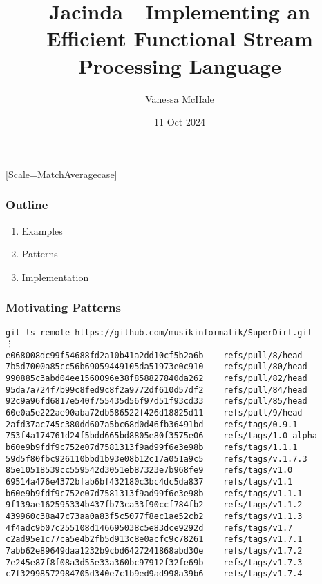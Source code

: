 \documentclass{beamer}
\begin{document}
\setmonofont{Jet Brains Mono}[Scale=MatchAveragecase]

\title{Jacinda---Implementing an Efficient Functional Stream Processing Language}
\author{Vanessa McHale}
\date{11 Oct 2024}

\begin{frame}
\titlepage
\end{frame}

\begin{frame}
  \frametitle{Outline}
  \begin{enumerate}
    \item Examples
    \item Patterns
    \item Implementation
  \end{enumerate}
\end{frame}

\begin{frame}
  \frametitle{Motivating Patterns}
\end{frame}

\begin{frame}[fragile]
\begin{Verbatim}[fontsize=\tiny]
git ls-remote https://github.com/musikinformatik/SuperDirt.git
⋮
e068008dc99f54688fd2a10b41a2dd10cf5b2a6b	refs/pull/8/head
7b5d7000a85cc56b69059449105da51973e0c910	refs/pull/80/head
990885c3abd04ee1560096e38f858827840da262	refs/pull/82/head
95da7a724f7b99c8fed9c8f2a9772df610d57df2	refs/pull/84/head
92c9a96fd6817e540f755435d56f97d51f93cd33	refs/pull/85/head
60e0a5e222ae90aba72db586522f426d18825d11	refs/pull/9/head
2afd37ac745c380dd607a5bc68d0d46fb36491bd	refs/tags/0.9.1
753f4a174761d24f5bdd665bd8805e80f3575e06	refs/tags/1.0-alpha
b60e9b9fdf9c752e07d7581313f9ad99f6e3e98b	refs/tags/1.1.1
59d5f80fbc926110bbd1b93e08b12c17a051a9c5	refs/tags/v.1.7.3
85e10518539cc559542d3051eb87323e7b968fe9	refs/tags/v1.0
69514a476e4372bfab6bf432180c3bc4dc5da837	refs/tags/v1.1
b60e9b9fdf9c752e07d7581313f9ad99f6e3e98b	refs/tags/v1.1.1
9f139ae162595334b437fb73ca33f90ccf784fb2	refs/tags/v1.1.2
439960c38a47c73aa0a83f5c5077f8ec1ae52cb2	refs/tags/v1.1.3
4f4adc9b07c255108d146695038c5e83dce9292d	refs/tags/v1.7
c2ad95e1c77ca5e4b2fb5d913c8e0acfc9c78261	refs/tags/v1.7.1
7abb62e89649daa1232b9cbd6427241868abd30e	refs/tags/v1.7.2
7e245e87f8f08a3d55e33a360bc97912f32fe69b	refs/tags/v1.7.3
c7f32998572984705d340e7c1b9ed9ad998a39b6	refs/tags/v1.7.4
\end{Verbatim}
\end{frame}


\end{document}
